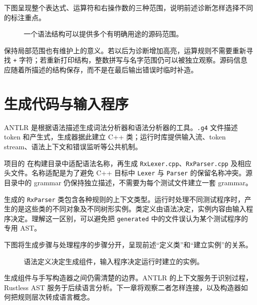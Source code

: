 下图呈现整个表达式、运算符和右操作数的三种范围，说明前述诊断怎样选择不同的标注重点。
\begin{figure}[htbp]
\centering
{}
\caption{一个语法结构可以提供多个有明确用途的源码范围。}
\end{figure}
保持局部范围也有维护上的意义。若以后为诊断增加高亮，运算规则不需要重新寻找 \texttt{+} 字符；若重新打印结构，整数拼写与名字范围仍可以被独立观察。源码信息应随着所描述的结构保存，而不是在最后输出错误时临时补造。

\section{生成代码与输入程序}
ANTLR 是根据语法描述生成词法分析器和语法分析器的工具。\texttt{.g4} 文件描述 token 和产生式，生成器据此建立 C++ 类；运行时库提供输入流、token stream、语法上下文和错误监听等公共机制。

项目的  在构建目录中适配语法名称，再生成 \texttt{RxLexer.cpp}、\texttt{RxParser.cpp} 及相应头文件。名称适配是为了避免 C++ 目标中 \texttt{Lexer} 与 \texttt{Parser} 的保留名称冲突。源目录中的 grammar 仍保持独立描述，不需要为每个测试文件建立一套 grammar。

生成的 \texttt{RxParser} 类包含各种规则的上下文类型。运行时处理不同测试程序时，产生的是这些类的不同对象及不同树形实例。类定义由语法决定，实例内容由输入程序决定。理解这一区别，可以避免把 \texttt{generated} 中的文件误认为某个测试程序的专用 AST。

下图将生成步骤与处理程序的步骤分开，呈现前述“定义类”和“建立实例”的关系。
\begin{figure}[htbp]
\centering
{}
\caption{语法定义决定生成组件，输入程序决定运行时建立的实例。}
\end{figure}
生成组件与手写构造器之间仍需清楚的边界。ANTLR 的上下文服务于识别过程，Rustless AST 服务于后续语言分析。下一章将观察二者怎样连接，以及构造器如何把规则层次转成语言概念。

